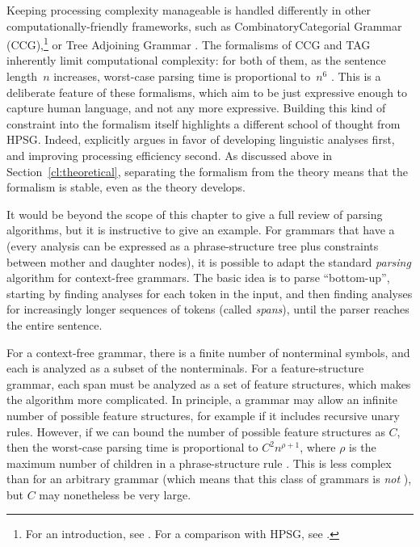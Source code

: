 \documentclass[output=paper,biblatex,babelshorthands,newtxmath,draftmode,colorlinks,citecolor=brown]{langscibook}
\begin{document}
\largerpage 
Keeping processing complexity manageable is handled differently in other computationally-friendly frameworks, such as Combinatory\indexccg Categorial Grammar (CCG),\footnote{%
	For an introduction, see \citet{steedman2011ccg}.
	For a comparison with HPSG, see .
}
or Tree Adjoining Grammar \citep[TAG;][]{Joshi87a-u,SAJ88a-u}.
The formalisms of CCG and TAG inherently limit computational complexity:
for both of them, as the sentence length~$n$ increases,
worst-case parsing time is proportional to~$n^6$ \citep{Kasamietal1989}.
This is a deliberate feature of these formalisms,
which aim to be just expressive enough to capture human language,
and not any more expressive.
Building this kind of constraint into the formalism itself
highlights a different school of thought from HPSG.
Indeed, \citet[64]{MuellerCoreGram} explicitly argues
in favor of developing linguistic analyses first,
and improving processing efficiency second.
As discussed above in Section~\ref{cl:theoretical},
separating the formalism from the theory
means that the formalism is stable, even as the theory develops.

It would be beyond the scope of this chapter to give a full review of parsing
algorithms, but it is instructive to give an example.  For grammars that have a  (every analysis can be expressed as a phrase-structure tree plus constraints between
mother and daughter nodes), it is possible to adapt the standard \textit{parsing} algorithm
\citep{kay:1973} for context-free grammars.
The basic idea is to parse ``bottom-up'',
starting by finding analyses for each token in the input,
and then finding analyses for increasingly longer sequences of tokens (called \textit{spans}),
until the parser reaches the entire sentence.

For a context-free grammar,
there is a finite number of nonterminal symbols,
and each  is analyzed as a subset of the nonterminals.
For a feature-structure grammar, each span must be analyzed as a set of feature structures,
which makes the algorithm more complicated.
In principle, a grammar may allow an infinite number of possible feature structures,
for example if it includes recursive unary rules.
However, if we can bound the number of possible feature structures as $C$,
then the worst-case parsing time is proportional to $C^2 n^{\rho+1}$,
where $\rho$ is the maximum number of children in a phrase-structure rule
\citep[Section~3.2.3]{carroll1993parse}. 
This is less complex than for an arbitrary grammar
(which means that this class of grammars is \emph{not} ),
but $C$ may nonetheless be very large.
\end{document}
